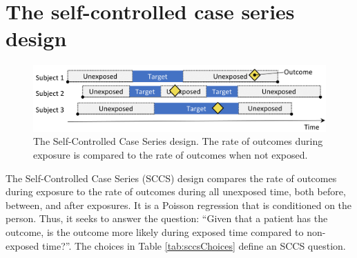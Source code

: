 \documentclass[11pt]{book}
\theoremstyle{definition}
\theoremstyle{definition}
\theoremstyle{definition}
\theoremstyle{remark}
\begin{document}
\hypertarget{the-self-controlled-case-series-design}{%
\section{The self-controlled case series design}\label{the-self-controlled-case-series-design}}


\begin{figure}

{\centering \includegraphics[width=0.9\linewidth]{images/PopulationLevelEstimation/selfControlledCaseSeries} 

}

\caption{The Self-Controlled Case Series design. The rate of outcomes during exposure is compared to the rate of outcomes when not exposed.}\label{fig:selfControlledCaseSeries}
\end{figure}

The Self-Controlled Case Series (SCCS) design \citep{farrington_1995, whitaker_2006} compares the rate of outcomes during exposure to the rate of outcomes during all unexposed time, both before, between, and after exposures. It is a Poisson regression that is conditioned on the person. Thus, it seeks to answer the question: ``Given that a patient has the outcome, is the outcome more likely during exposed time compared to non-exposed time?''. The choices in Table \ref{tab:sccsChoices} define an SCCS question.  
\end{document}

